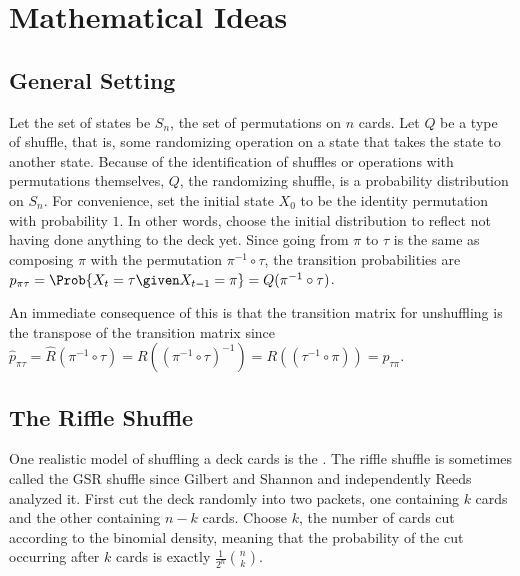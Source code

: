 \documentclass[12pt]{article}
\begin{document}
\hr

\section*{Mathematical Ideas}

\subsection*{General Setting}

Let the set of states be \( S_n \), the set of permutations on \( n \)
cards. Let \( Q \) be a type of shuffle, that is, some randomizing
operation on a state that takes the state to another state.  Because of
the identification of shuffles or operations with permutations
themselves, \( Q \), the randomizing shuffle, is a probability
distribution on \( S_n \).  For convenience, set the initial state \( X_0
\) to be the identity permutation with probability \( 1 \).  In other
words, choose the initial distribution to reflect not having done
anything to the deck yet.  Since going from \( \pi \) to \( \tau \) is
the same as composing \( \pi \) with the permutation \( \pi^{-1} \circ
\tau \), the transition probabilities are \( p_{\pi \tau} = \Prob{X_t =
\tau \given X_{t-1} = \pi} = Q(\pi^{-1} \circ \tau) \).

An immediate consequence of this is that the transition matrix for
unshuffling is the transpose of the transition matrix since \( \hat{p}_{\pi
\tau} = \hat{R}(\pi^{-1} \circ \tau) = R((\pi^{-1} \circ \tau)^{-1}) = R
((\tau^{-1} \circ \pi)) = p_{\tau \pi} \).

\subsection*{The Riffle Shuffle}

One realistic model of shuffling a deck cards is the .%
The riffle shuffle is sometimes called the GSR shuffle since Gilbert and
Shannon and independently Reeds analyzed it.  First cut the deck
randomly into two packets, one containing \( k \) cards and the other
containing \( n-k \) cards.  Choose \( k \), the number of cards cut
according to the binomial density, meaning that the probability of the
cut occurring after \( k \) cards is exactly \( \frac{1}{2^n}\binom{n}{k}
\).
\end{document}
